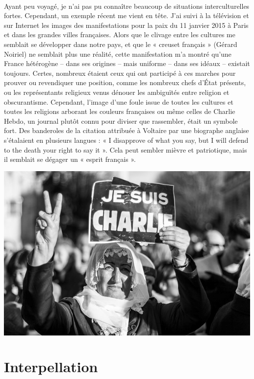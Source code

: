 \paragraph{}
Ayant peu voyagé, je n'ai pas pu connaître beaucoup de situations interculturelles fortes. Cependant, un exemple récent me vient en tête. J'ai suivi à la télévision et sur Internet les images des manifestations pour la paix du 11 janvier 2015 à Paris et dans les grandes villes françaises. Alors que le clivage entre les cultures me semblait se développer dans notre pays, et que le « creuset français » (Gérard Noiriel) ne semblait plus une réalité, cette manifestation m'a montré qu'une France hétérogène – dans ses origines – mais uniforme – dans ses idéaux – existait toujours. Certes, nombreux étaient ceux qui ont participé à ces marches pour prouver ou revendiquer une position, comme les nombreux chefs d'État présents, ou les représentants religieux venus dénouer les ambiguïtés entre religion et obscurantisme. Cependant, l'image d'une foule issue de toutes les cultures et toutes les religions arborant les couleurs françaises ou même celles de Charlie Hebdo, un journal plutôt connu pour diviser que rassembler, était un symbole fort. Des banderoles de la citation attribuée à Voltaire par une biographe anglaise s’étalaient en plusieurs langues : « I disapprove of what you say, but I will defend to the death your right to say it ». Cela peut sembler mièvre et patriotique, mais il semblait se dégager un « esprit français ».
\begin{center}
\includegraphics[scale=0.5]{charlie.jpg}
\end{center}

\section{Interpellation}
